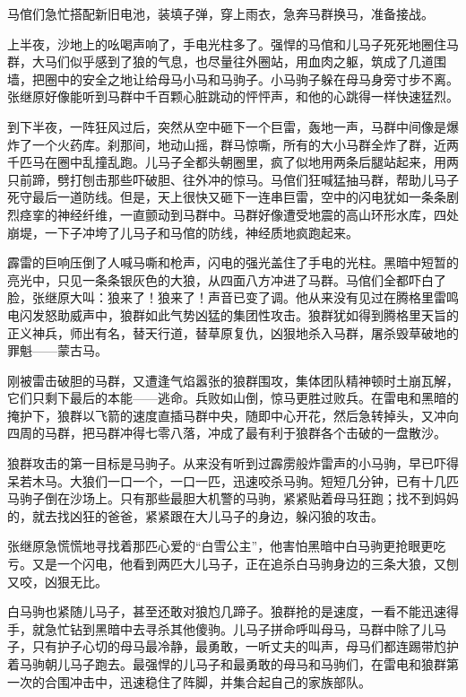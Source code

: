 \par 马倌们急忙搭配新旧电池，装填子弹，穿上雨衣，急奔马群换马，准备接战。
\par 上半夜，沙地上的吆喝声响了，手电光柱多了。强悍的马倌和儿马子死死地圈住马群，大马们似乎感到了狼的气息，也尽量往外圈站，用血肉之躯，筑成了几道围墙，把圈中的安全之地让给母马小马和马驹子。小马驹子躲在母马身旁寸步不离。张继原好像能听到马群中千百颗心脏跳动的怦怦声，和他的心跳得一样快速猛烈。
\par 到下半夜，一阵狂风过后，突然从空中砸下一个巨雷，轰地一声，马群中间像是爆炸了一个火药库。刹那间，地动山摇，群马惊嘶，所有的大小马群全炸了群，近两千匹马在圈中乱撞乱跑。儿马子全都头朝圈里，疯了似地用两条后腿站起来，用两只前蹄，劈打刨击那些吓破胆、往外冲的惊马。马倌们狂喊猛抽马群，帮助儿马子死守最后一道防线。但是，天上很快又砸下一连串巨雷，空中的闪电犹如一条条剧烈痉挛的神经纤维，一直颤动到马群中。马群好像遭受地震的高山环形水库，四处崩堤，一下子冲垮了儿马子和马倌的防线，神经质地疯跑起来。
\par 霹雷的巨响压倒了人喊马嘶和枪声，闪电的强光盖住了手电的光柱。黑暗中短暂的亮光中，只见一条条银灰色的大狼，从四面八方冲进了马群。马倌们全都吓白了脸，张继原大叫：狼来了！狼来了！声音已变了调。他从来没有见过在腾格里雷鸣电闪发怒助威声中，狼群如此气势凶猛的集团性攻击。狼群犹如得到腾格里天旨的正义神兵，师出有名，替天行道，替草原复仇，凶狠地杀入马群，屠杀毁草破地的罪魁——蒙古马。
\par 刚被雷击破胆的马群，又遭逢气焰嚣张的狼群围攻，集体团队精神顿时土崩瓦解，它们只剩下最后的本能——逃命。兵败如山倒，惊马更胜过败兵。在雷电和黑暗的掩护下，狼群以飞箭的速度直插马群中央，随即中心开花，然后急转掉头，又冲向四周的马群，把马群冲得七零八落，冲成了最有利于狼群各个击破的一盘散沙。
\par 狼群攻击的第一目标是马驹子。从来没有听到过霹雳般炸雷声的小马驹，早已吓得呆若木马。大狼们一口一个，一口一匹，迅速咬杀马驹。短短几分钟，已有十几匹马驹子倒在沙场上。只有那些最胆大机警的马驹，紧紧贴着母马狂跑；找不到妈妈的，就去找凶狂的爸爸，紧紧跟在大儿马子的身边，躲闪狼的攻击。
\par 张继原急慌慌地寻找着那匹心爱的“白雪公主”，他害怕黑暗中白马驹更抢眼更吃亏。又是一个闪电，他看到两匹大儿马子，正在追杀白马驹身边的三条大狼，又刨又咬，凶狠无比。
\par 白马驹也紧随儿马子，甚至还敢对狼尥几蹄子。狼群抢的是速度，一看不能迅速得手，就急忙钻到黑暗中去寻杀其他傻驹。儿马子拼命呼叫母马，马群中除了儿马子，只有护子心切的母马最冷静，最勇敢，一听丈夫的叫声，母马们都连踢带尥护着马驹朝儿马子跑去。最强悍的儿马子和最勇敢的母马和马驹们，在雷电和狼群第一次的合围冲击中，迅速稳住了阵脚，并集合起自己的家族部队。
